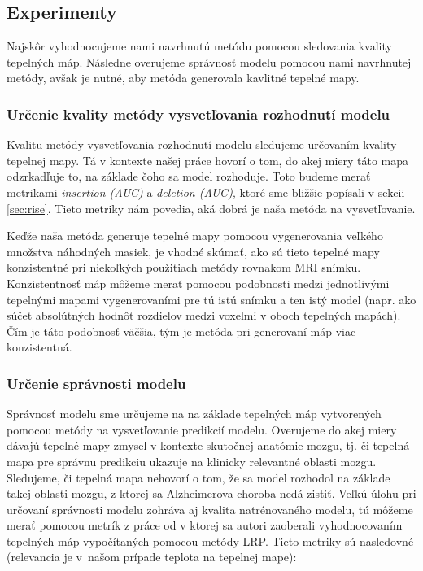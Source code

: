 \subsection{Experimenty \label{sec:design_experiments}}

Najskôr vyhodnocujeme nami navrhnutú metódu pomocou sledovania kvality tepelných máp. Následne overujeme správnosť modelu pomocou nami navrhnutej metódy, avšak je nutné, aby metóda generovala kavlitné tepelné mapy.

\subsubsection{Určenie kvality metódy vysvetľovania rozhodnutí modelu \label{sec:evaluation_design_method_quality}}

Kvalitu metódy vysvetľovania rozhodnutí modelu sledujeme určovaním kvality tepelnej mapy. Tá v kontexte našej práce hovorí o tom, do akej miery táto mapa odzrkadľuje to, na základe čoho sa model rozhoduje. Toto budeme merať metrikami \textit{insertion (AUC)} a \textit{deletion (AUC)}, ktoré sme bližšie popísali v sekcii \ref{sec:rise}. Tieto metriky nám povedia, aká dobrá je naša metóda na vysvetľovanie.

Keďže naša metóda generuje tepelné mapy pomocou vygenerovania veľkého množstva náhodných masiek, je vhodné skúmať, ako sú tieto tepelné mapy konzistentné pri niekoľkých použitiach metódy rovnakom MRI snímku. Konzistentnosť máp môžeme merať pomocou podobnosti medzi jednotlivými tepelnými mapami vygenerovaními pre tú istú snímku a ten istý model (napr. ako súčet absolútných hodnôt rozdielov medzi voxelmi v oboch tepelných mapách). Čím je táto podobnosť väčšia, tým je metóda pri generovaní máp viac konzistentná.

\subsubsection{Určenie správnosti modelu \label{sec:heat_maps_and_model_segmentation_masks}}

Správnosť modelu sme určujeme na na základe tepelných máp vytvorených pomocou metódy na vysvetľovanie predikcií modelu. Overujeme do akej miery dávajú tepelné mapy zmysel v kontexte skutočnej anatómie mozgu, tj. či tepelná mapa pre správnu predikciu ukazuje na klinicky relevantné oblasti mozgu. Sledujeme, či tepelná mapa nehovorí o tom, že sa model rozhodol na základe takej oblasti mozgu, z ktorej sa Alzheimerova choroba nedá zistiť. Veľkú úlohu pri určovaní správnosti modelu zohráva aj kvalita natrénovaného modelu, tú môžeme merať pomocou metrík z práce od \citeauthor*{bohle2019layer} v ktorej sa autori zaoberali vyhodnocovaním tepelných máp vypočítaných pomocou metódy LRP. Tieto metriky sú nasledovné (relevancia je v našom prípade teplota na tepelnej mape):

